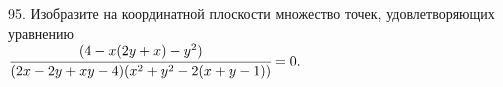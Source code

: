 95. Изобразите на координатной плоскости множество точек, удовлетворяющих уравнению \\ $\cfrac{(4-x(2y+x)-y^2)}{(2x-2y+xy-4)(x^2+y^2-2(x+y-1))}=0.$
\newpage
